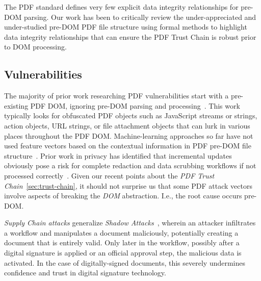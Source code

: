 The PDF standard defines very few explicit data integrity relationships for pre-DOM parsing. 
Our work has been to critically review the under-appreciated and under-studied pre-DOM PDF
file structure using formal methods to highlight data integrity relationships that can 
ensure the PDF Trust Chain is robust prior to DOM processing.

\subsection{Vulnerabilities}
\label{sec:vulnerabilities}


The majority of prior work researching PDF vulnerabilities start with a pre-existing PDF DOM,
ignoring pre-DOM parsing and processing~\cite{smutzMaliciousPDFDetection2012,liuDetectingMaliciousJavascript2014,iwamotoStudyMaliciousPDF2016}. 
This work typically looks for obfuscated PDF objects such as
JavaScript streams or strings, action objects, URL strings, or file attachment objects that 
can lurk in various places throughout the PDF DOM. Machine-learning approaches so far have not  
used feature vectors based on the contextual information in PDF pre-DOM file structure~\cite{andrewmangleAnalysisMachineLearning2021,manharmohammedHAPSSAHolisticApproach2021}. 
Prior work in privacy has identified that incremental updates obviously pose a risk for complete
redaction and data scrubbing workflows if not processed correctly~\cite{adhataraoHowArePDF2021,y.fengSystematicMethodPDF2018}.
Given our recent points about the \emph{PDF Trust Chain}~\cref{sec:trust-chain}, it should not 
surprise us that some PDF attack vectors involve aspects of breaking the \emph{DOM} abstraction.
I.e., the root cause occurs pre-DOM.

\emph{Supply Chain attacks} generalize \emph{Shadow
  Attacks}~\cite{mainkaShadowAttacksHiding2021}, wherein an attacker
infiltrates a workflow and manipulates a document maliciously,
potentially creating a document that is entirely valid.
%
Only later in the workflow, possibly after a digital signature is
applied or an official approval step, the malicious data is
activated.
%
In the case of digitally-signed documents, this severely undermines
confidence and trust in digital signature technology.


